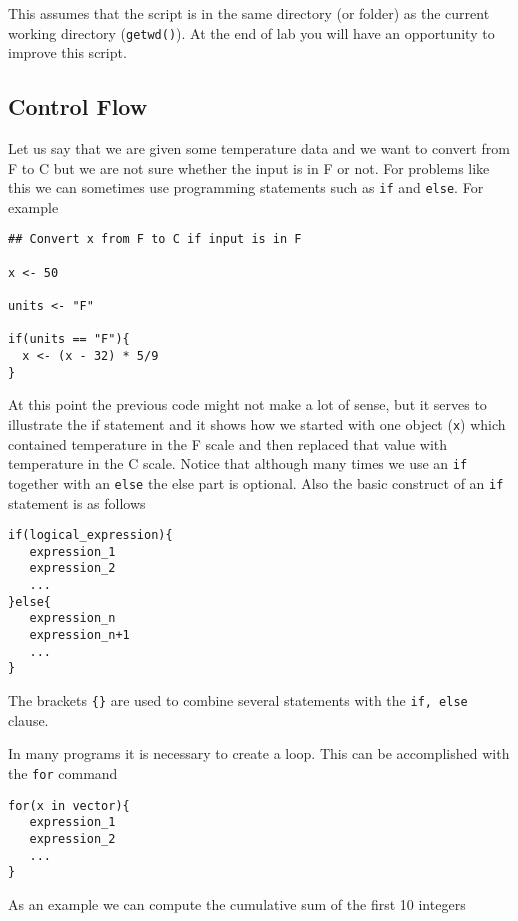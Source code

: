 This assumes that the script is in the same directory (or folder) as
the current working directory (\texttt{getwd()}). At the end of lab
you will have an opportunity to improve this script.

\subsection{Control Flow}

Let us say that we are given some temperature data and we want to
convert from F to C but we are not sure whether the input is in F or
not. For problems like this we can sometimes use programming
statements such as \texttt{if} and \texttt{else}. For example

\begin{lstlisting}
## Convert x from F to C if input is in F

x <- 50

units <- "F"

if(units == "F"){
  x <- (x - 32) * 5/9
}

\end{lstlisting}

At this point the previous code might not make a lot of sense, but it
serves to illustrate the if statement and it shows how we started with
one object (\texttt{x}) which contained temperature in the F scale and
then replaced that value with temperature in the C scale. Notice that
although many times we use an \texttt{if} together with an
\texttt{else} the else part is optional. Also the basic construct of
an \texttt{if} statement is as follows

\begin{lstlisting}
if(logical_expression){
   expression_1
   expression_2
   ...
}else{
   expression_n
   expression_n+1
   ...
}
\end{lstlisting}

The brackets \texttt{\{\}} are used to combine several statements with
the \texttt{if, else} clause.

In many programs it is necessary to create a loop. This can be
accomplished with the \texttt{for} command

\begin{lstlisting}
for(x in vector){
   expression_1
   expression_2
   ...
}
\end{lstlisting}

As an example we can compute the cumulative sum of the first 10 integers

